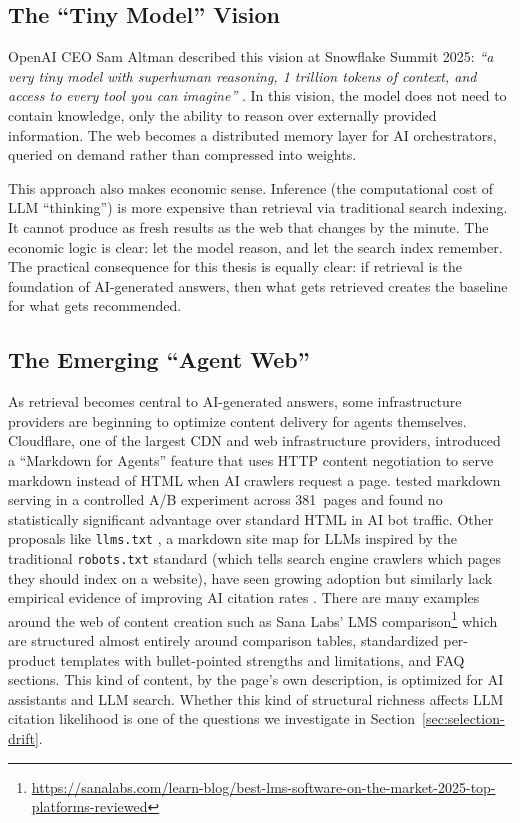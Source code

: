 \subsection{The ``Tiny Model'' Vision}
\label{sec:rag-economics}
\label{sec:reasoning-models}

OpenAI CEO Sam Altman described this vision at Snowflake Summit 2025: \textit{``a very tiny model with superhuman reasoning, 1 trillion tokens of context, and access to every tool you can imagine''} \parencite{altman2025snowflake}. In this vision, the model does not need to contain knowledge, only the ability to reason over externally provided information. The web becomes a distributed memory layer for AI orchestrators, queried on demand rather than compressed into weights.

This approach also makes economic sense. Inference (the computational cost of LLM ``thinking'') is more expensive than retrieval via traditional search indexing. It cannot produce as fresh results as the web that changes by the minute. The economic logic is clear: let the model reason, and let the search index remember. The practical consequence for this thesis is equally clear: if retrieval is the foundation of AI-generated answers, then what gets retrieved creates the baseline for what gets recommended.

\subsection{The Emerging ``Agent Web''}
\label{sec:agent-web}

As retrieval becomes central to AI-generated answers, some infrastructure providers are beginning to optimize content delivery for agents themselves. Cloudflare, one of the largest CDN and web infrastructure providers, introduced a ``Markdown for Agents'' feature \parencite{martinho2026markdown} that uses HTTP content negotiation to serve markdown instead of HTML when AI crawlers request a page. \textcite{punturo2026markdown} tested markdown serving in a controlled A/B experiment across 381~pages and found no statistically significant advantage over standard HTML in AI bot traffic. 
Other proposals like \texttt{llms.txt} \parencite{howard2024llmstxt}, a markdown site map for LLMs inspired by the traditional \texttt{robots.txt} standard (which tells search engine crawlers which pages they should index on a website), have seen growing adoption but similarly lack empirical evidence of improving AI citation rates \parencite{seranking2025llmstxt}.
There are many examples around the web of content creation such as Sana Labs' LMS comparison\footnote{\url{https://sanalabs.com/learn-blog/best-lms-software-on-the-market-2025-top-platforms-reviewed}} which are structured almost entirely around comparison tables, standardized per-product templates with bullet-pointed strengths and limitations, and FAQ sections. This kind of content, by the page's own description, is optimized for AI assistants and LLM search. Whether this kind of structural richness affects LLM citation likelihood is one of the questions we investigate in Section~\ref{sec:selection-drift}.

